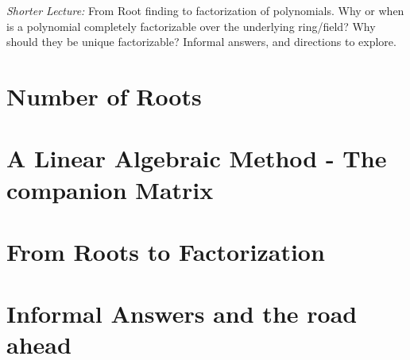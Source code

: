 
\noindent
\textit{Shorter Lecture:}
From Root finding to factorization of polynomials. Why or when is a polynomial completely factorizable over the underlying ring/field? Why should they be unique factorizable? Informal answers, and directions to explore.

\section{Number of Roots}

\section{A Linear Algebraic Method - The companion Matrix}

\section{From Roots to Factorization}

\section{Informal Answers and the road ahead}